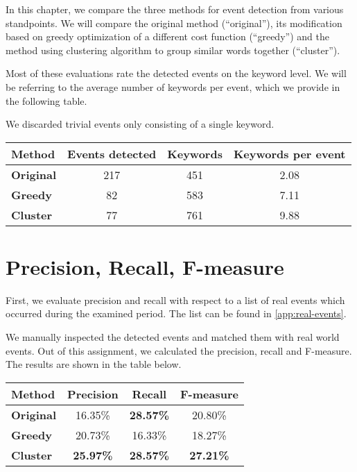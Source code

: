 In this chapter, we compare the three methods for event detection from various standpoints. We will compare the original method (``original''), its modification based on greedy optimization of a different cost function (``greedy'') and the method using clustering algorithm to group similar words together (``cluster'').

Most of these evaluations rate the detected events on the keyword level. We will be referring to the average number of keywords per event, which we provide in the following table.

We discarded trivial events only consisting of a single keyword.

\hspace{\fill}

\begin{minipage}{\linewidth}
\centering
\begin{tabular}{ l c c c }\toprule[1.5pt]
\bf Method 	 & \bf Events detected & \bf Keywords & \bf Keywords per event \\ \midrule
\bf Original & 217 & 451 & 2.08 \\
\bf Greedy   & 82 & 583 & 7.11 \\
\bf Cluster & 77 & 761 & 9.88 \\ \bottomrule[1.25pt]
\end {tabular}\par
{} \label{tab:title}
\end{minipage}

\hspace{\fill}

\section{Precision, Recall, F-measure}

First, we evaluate precision and recall with respect to a list of real events which occurred during the examined period. The list can be found in \autoref{app:real-events}.

We manually inspected the detected events and matched them with real world events. Out of this assignment, we calculated the precision, recall and F-measure. The results are shown in the table below.

\hspace{\fill}

\begin{minipage}{\linewidth}
\centering
\begin{tabular}{ l c c c }\toprule[1.5pt]
\bf Method 	 & \bf Precision & \bf Recall & \bf F-measure \\ \midrule
\bf Original &  16.35\%     & \bf 28.57\%     &  20.80\% \\
\bf Greedy   &  20.73\%     & 16.33\%      &  18.27\% \\
\bf Cluster &  \bf 25.97\%     & \bf 28.57\%      & \bf 27.21\% \\ \bottomrule[1.25pt]
\end {tabular}\par
{} \label{tab:title}
\end{minipage}


